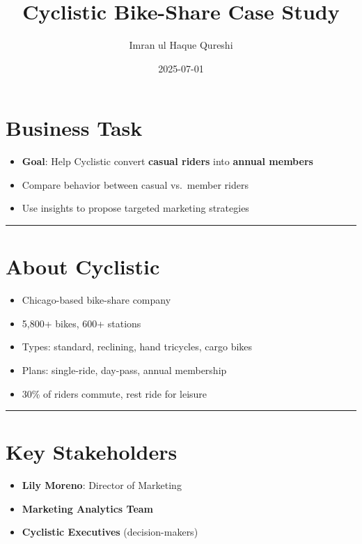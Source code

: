 \documentclass[
]{article}
\title{Cyclistic Bike-Share Case Study}
\author{Imran ul Haque Qureshi}
\date{2025-07-01}
\providecommand{\tightlist}{%
  \setlength{\itemsep}{0pt}\setlength{\parskip}{0pt}}
\begin{document}
\maketitle

\section{Business Task}\label{business-task}

\begin{itemize}
\tightlist
\item
  \textbf{Goal}: Help Cyclistic convert \textbf{casual riders} into
  \textbf{annual members}
\item
  Compare behavior between casual vs.~member riders
\item
  Use insights to propose targeted marketing strategies
\end{itemize}

\begin{center}\rule{0.5\linewidth}{0.5pt}\end{center}

\section{About Cyclistic}\label{about-cyclistic}

\begin{itemize}
\tightlist
\item
  Chicago-based bike-share company\\
\item
  5,800+ bikes, 600+ stations
\item
  Types: standard, reclining, hand tricycles, cargo bikes
\item
  Plans: single-ride, day-pass, annual membership
\item
  30\% of riders commute, rest ride for leisure
\end{itemize}

\begin{center}\rule{0.5\linewidth}{0.5pt}\end{center}

\section{Key Stakeholders}\label{key-stakeholders}

\begin{itemize}
\tightlist
\item
  \textbf{Lily Moreno}: Director of Marketing
\item
  \textbf{Marketing Analytics Team}
\item
  \textbf{Cyclistic Executives} (decision-makers)
\end{itemize}
\end{document}
